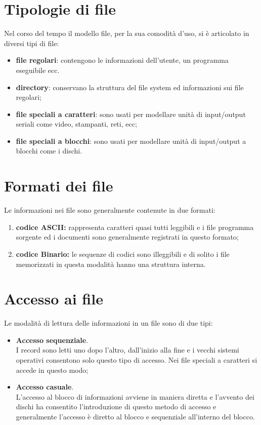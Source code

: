 \documentclass[12pt, letterpaper]{report}
\begin{document}
	\section{Tipologie di file}
	Nel corso del tempo il modello file, per la sua comodità d'uso, si è articolato in diversi tipi di file:
	\begin{itemize}
		\item \textbf{file regolari}: contengono le informazioni dell'utente, un programma eseguibile ecc.
		\item \textbf{directory}: conservano la struttura del file system ed informazioni sui file regolari;
		\item \textbf{file speciali a caratteri}: sono usati per modellare unità di input/output seriali come video, stampanti, reti, ecc;
		\item \textbf{file speciali a blocchi}: sono usati per modellare unità di input/output a blocchi come i dischi.
	\end{itemize}
	\section{Formati dei file}
	Le informazioni nei file sono generalmente contenute in due formati:
	\begin{enumerate}
		\item \textbf{codice ASCII:} rappresenta caratteri quasi tutti leggibili e i file programma sorgente ed i documenti sono generalmente registrati in questo formato;
		\item \textbf{codice Binario:} le sequenze di codici sono illeggibili e di solito i file memorizzati in questa modalità hanno una struttura interna.
	\end{enumerate}
	\section{Accesso ai file}
	Le modalità di lettura delle informazioni in un file sono di due tipi:
	\begin{itemize}
		\item \textbf{Accesso sequenziale}. \\
		I record sono letti uno dopo l'altro, dall'inizio alla fine e i vecchi sistemi operativi consentono solo questo tipo di accesso. Nei file speciali a caratteri si accede in questo modo;
		\item \textbf{Accesso casuale}. \\
		L'accesso al blocco di informazioni avviene in maniera diretta e l'avvento dei dischi ha consentito l'introduzione di questo metodo di accesso e generalmente l'accesso è diretto al blocco e sequenziale all'interno del blocco.
	\end{itemize}
\end{document}

